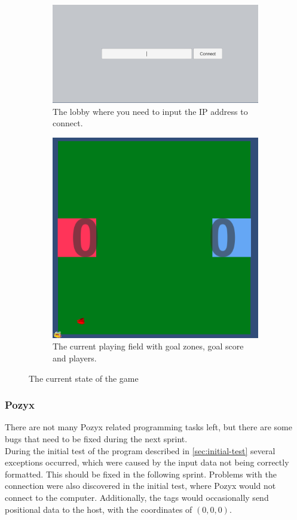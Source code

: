 \begin{figure}[H]
    \centering
    \begin{subfigure}{.5\textwidth}
        \centering
        \includegraphics[width=1\linewidth]{figures/sprint-4-lobby.PNG}
        \caption{The lobby where you need to input the IP address to connect.}
        \label{fig:sprint-4-lobby}
    \end{subfigure}
    \begin{subfigure}{.4\textwidth}
        \centering
        \includegraphics[width=.8\linewidth]{figures/sprint-4-game.PNG}
        \caption{The current playing field with goal zones, goal score and players.}
        \label{fig:sprint-4-game}
    \end{subfigure}
    \caption{The current state of the game}
    \label{fig:sprint-4-state-of-game}
\end{figure}

\subsubsection{Pozyx}
There are not many Pozyx related programming tasks left, but there are some bugs that need to be fixed during the next sprint.
\\
During the initial test of the program described in \autoref{sec:initial-test} several exceptions occurred, which were caused by the input data not being correctly formatted.
This should be fixed in the following sprint.
Problems with the connection were also discovered in the initial test, where Pozyx would not connect to the computer.
Additionally, the tags would occasionally send positional data to the host, with the coordinates of $(0, 0, 0)$.

